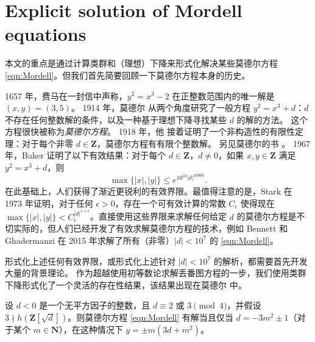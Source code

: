 \documentclass[sigplan,10pt,nonacm,
screen]{acmart} \settopmatter{printfolios=true,printccs=false,printacmref=false}
\newcommand{\ZZ}{\mathbf{Z}}
\newcommand{\NN}{\mathbf{N}}
\DeclareMathOperator{\Cl}{Cl}
\begin{document}

\section{Explicit solution of Mordell equations}\label{sec:Mordell}

本文的重点是通过计算类群和（理想）下降来形式化解决某些莫德尔方程 \eqref{eqn:Mordell}。但我们首先简要回顾一下莫德尔方程本身的历史。

1657 年，费马在一封信中声称，$y^2 = x^3 - 2$ 在正整数范围内的唯一解是 $(x,y)= (3, 5)$。
%
1914 年，莫德尔 \cite{mordell14} 从两个角度研究了一般方程 $y^2 = x^3 + d$：$d$ 不存在任何整数解的条件，以及一种基于理想下降寻找某些 $d$ 的解的方法。
这个方程很快被称为\emph{莫德尔方程}。
%
1918 年，他 \cite{mordell1920} 接着证明了一个非构造性的有限性定理：对于每个非零 $d \in \ZZ$，莫德尔方程有有限个整数解。
另见莫德尔的书 \cite[Chapter 26]{mordell1969diophantine}。
%
1967 年，Baker \cite{baker68} 证明了以下有效结果：对于每个 $d \in \ZZ$，$d \neq 0$，如果 $x,y \in \ZZ$ 满足 $y^2=x^3+d$，则
    \begin{equation}\label{eqn:BakerBoundMordell}
        \max\{|x|,|y|\} \leq e^{10^{10}|d|^{10000}}.
    \end{equation}
在此基础上，人们获得了渐近更锐利的有效界限。最值得注意的是，Stark \cite{Stark1973} 在 1973 年证明，对于任何 $\epsilon >0$，存在一个可有效计算的常数 $C_\epsilon$ 使得现在 $\max\{|x|,|y|\}<C_\epsilon^{|d|^{1+\epsilon}}$。直接使用这些界限来求解任何给定 $d$ 的莫德尔方程是不切实际的，但人们已经开发了有效求解莫德尔方程的技术，例如 Bennett 和 Ghadermanzi \cite{bennett_mordells_2015} 在 2015 年求解了所有（非零）$|d|<10^7$ 的 \eqref{eqn:Mordell}。

形式化上述任何有效界限，或形式化上述针对 $|d|<10^7$ 的解析，都需要首先开发大量的背景理论。
作为超越使用初等数论求解丢番图方程的一步，我们使用类群下降形式化了一个灵活的存在性结果，该结果出现在莫德尔 \cite[Section 8]{mordell14} 中。

\begin{theorem}\label{thm:Mordell_basic}
    设 $d<0$ 是一个无平方因子的整数，且 $d\equiv 2 \text{ 或 } 3 \pmod{4}$，并假设 $3\nmid h(\ZZ[\sqrt{d}])$。则莫德尔方程 \eqref{eqn:Mordell} 有解当且仅当 $d=-3m^2 \pm 1$（对于某个 $m\in \NN$），在这种情况下 $y = \pm m (3d+m^2)$。
\end{theorem}
\end{document}
